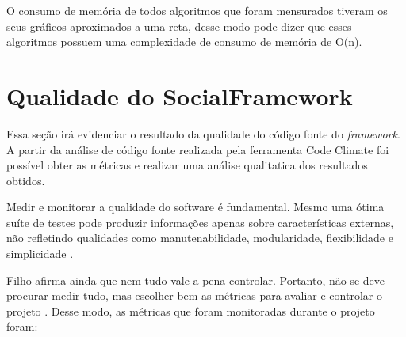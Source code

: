 O consumo de memória de todos algoritmos que foram mensurados tiveram os seus gráficos aproximados a uma reta, desse modo pode dizer que esses algoritmos possuem uma complexidade de consumo de memória de O(n).

\section{Qualidade do SocialFramework}

Essa seção irá evidenciar o resultado da qualidade do código fonte do \textit{framework}. A partir da análise de código fonte realizada pela ferramenta Code Climate foi possível obter as métricas e realizar uma análise qualitatica dos resultados obtidos.

Medir e monitorar a qualidade do software é fundamental. Mesmo uma ótima suíte de testes pode produzir informações apenas sobre características externas, não refletindo qualidades como manutenabilidade, modularidade, flexibilidade e simplicidade \cite{Filho:2013}.

Filho afirma ainda que nem tudo vale a pena controlar. Portanto, não se deve procurar medir tudo, mas escolher bem as métricas para avaliar e controlar o projeto \cite{Filho:2013}. Desse modo, as métricas que foram monitoradas durante o projeto foram:

